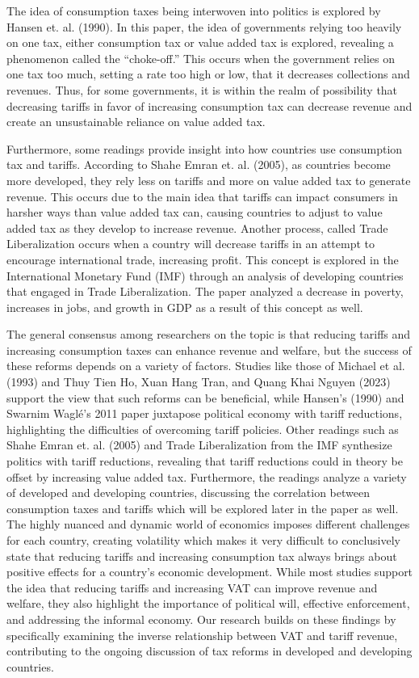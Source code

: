 \documentclass[12pt]{article}
\begin{document}
The idea of consumption taxes being interwoven into politics is explored by Hansen et. al. (1990). In this paper, the idea of governments relying too heavily on one tax, either consumption tax or value added tax is explored, revealing a phenomenon called the “choke-off.” This occurs when the government relies on one tax too much, setting a rate too high or low, that it decreases collections and revenues. Thus, for some governments, it is within the realm of possibility that decreasing tariffs in favor of increasing consumption tax can decrease revenue and create an unsustainable reliance on value added tax. 

Furthermore, some readings provide insight into how countries use consumption tax and tariffs. According to Shahe Emran et. al. (2005), as countries become more developed, they rely less on tariffs and more on value added tax to generate revenue. This occurs due to the main idea that tariffs can impact consumers in harsher ways than value added tax can, causing countries to adjust to value added tax as they develop to increase revenue. Another process, called Trade Liberalization occurs when a country will decrease tariffs in an attempt to encourage international trade, increasing profit. This concept is explored in the International Monetary Fund (IMF) through an analysis of developing countries that engaged in Trade Liberalization. The paper analyzed a decrease in poverty, increases in jobs, and growth in GDP as a result of this concept as well.

The general consensus among researchers on the topic is that reducing tariffs and increasing consumption taxes can enhance revenue and welfare, but the success of these reforms depends on a variety of factors. Studies like those of Michael et al. (1993) and Thuy Tien Ho, Xuan Hang Tran, and Quang Khai Nguyen (2023) support the view that such reforms can be beneficial, while Hansen’s (1990) and Swarnim Waglé's 2011 paper juxtapose political economy with tariff reductions, highlighting the difficulties of overcoming tariff policies. Other readings such as Shahe Emran et. al. (2005) and Trade Liberalization from the IMF synthesize politics with tariff reductions, revealing that tariff reductions could in theory be offset by increasing value added tax. Furthermore, the readings analyze a variety of developed and developing countries, discussing the correlation between consumption taxes and tariffs which will be explored later in the paper as well. The highly nuanced and dynamic world of economics imposes different challenges for each country, creating volatility which makes it very difficult to conclusively state that reducing tariffs and increasing consumption tax always brings about positive effects for a country's economic development. While most studies support the idea that reducing tariffs and increasing VAT can improve revenue and welfare, they also highlight the importance of political will, effective enforcement, and addressing the informal economy. Our research builds on these findings by specifically examining the inverse relationship between VAT and tariff revenue, contributing to the ongoing discussion of tax reforms in developed and developing countries.
\end{document}
